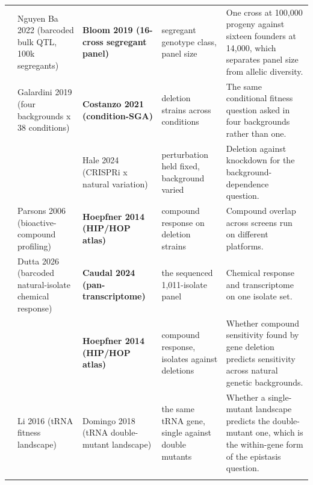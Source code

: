 \begin{landscape}
\begin{longtable}{@{}r@{\hspace{4pt}} L{42mm} L{44mm} L{48mm} L{96mm}@{}}
 & Nguyen Ba 2022 (barcoded bulk QTL, 100k segregants) & \textbf{Bloom 2019 (16-cross segregant panel)} & segregant genotype class, panel size & One cross at 100,000 progeny against sixteen founders at 14,000, which separates panel size from allelic diversity. \\
 & Galardini 2019 (four backgrounds x 38 conditions) & \textbf{Costanzo 2021 (condition-SGA)} & deletion strains across conditions & The same conditional fitness question asked in four backgrounds rather than one. \\
 &  & Hale 2024 (CRISPRi x natural variation) & perturbation held fixed, background varied & Deletion against knockdown for the background-dependence question. \\
 & Parsons 2006 (bioactive-compound profiling) & \textbf{Hoepfner 2014 (HIP/HOP atlas)} & compound response on deletion strains & Compound overlap across screens run on different platforms. \\
 & Dutta 2026 (barcoded natural-isolate chemical response) & \textbf{Caudal 2024 (pan-transcriptome)} & the sequenced 1,011-isolate panel & Chemical response and transcriptome on one isolate set. \\
 &  & \textbf{Hoepfner 2014 (HIP/HOP atlas)} & compound response, isolates against deletions & Whether compound sensitivity found by gene deletion predicts sensitivity across natural genetic backgrounds. \\
 & Li 2016 (tRNA fitness landscape) & Domingo 2018 (tRNA double-mutant landscape) & the same tRNA gene, single against double mutants & Whether a single-mutant landscape predicts the double-mutant one, which is the within-gene form of the epistasis question. \\
\addlinespace[5pt]
\end{longtable}
\endgroup
\end{landscape}
